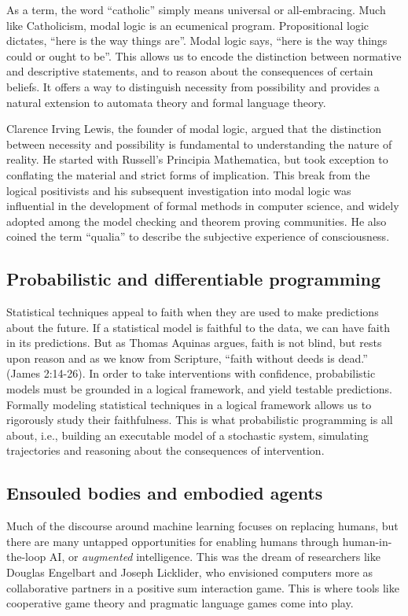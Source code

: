 \documentclass[sigplan,nonacm]{acmart}\settopmatter{printfolios=false,printccs=false,printacmref=false}
\begin{document}
As a term, the word ``catholic'' simply means universal or all-embracing. Much like Catholicism, modal logic is an ecumenical program. Propositional logic dictates, ``here is the way things are''. Modal logic says, ``here is the way things could or ought to be''. This allows us to encode the distinction between normative and descriptive statements, and to reason about the consequences of certain beliefs. It offers a way to distinguish necessity from possibility and provides a natural extension to automata theory and formal language theory.

Clarence Irving Lewis, the founder of modal logic, argued that the distinction between necessity and possibility is fundamental to understanding the nature of reality. He started with Russell's Principia Mathematica, but took exception to conflating the material and strict forms of implication. This break from the logical positivists and his subsequent investigation into modal logic was influential in the development of formal methods in computer science, and widely adopted among the model checking and theorem proving communities. He also coined the term ``qualia'' to describe the subjective experience of consciousness.

\subsection{Probabilistic and differentiable programming}

Statistical techniques appeal to faith when they are used to make predictions about the future. If a statistical model is faithful to the data, we can have faith in its predictions. But as Thomas Aquinas argues, faith is not blind, but rests upon reason and as we know from Scripture, ``faith without deeds is dead.'' (James 2:14-26). In order to take interventions with confidence, probabilistic models must be grounded in a logical framework, and yield testable predictions. Formally modeling statistical techniques in a logical framework allows us to rigorously study their faithfulness. This is what probabilistic programming is all about, i.e., building an executable model of a stochastic system, simulating trajectories and reasoning about the consequences of intervention.

\subsection{Ensouled bodies and embodied agents}

Much of the discourse around machine learning focuses on replacing humans, but there are many untapped opportunities for enabling humans through human-in-the-loop AI, or \textit{augmented} intelligence. This was the dream of researchers like Douglas Engelbart and Joseph Licklider, who envisioned computers more as collaborative partners in a positive sum interaction game. This is where tools like cooperative game theory and pragmatic language games come into play.
\end{document}
